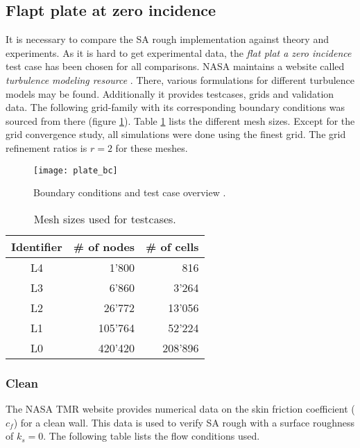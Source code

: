\subsection{Flapt plate at zero incidence}
\label{subsec:flat_plate_exp}
It is necessary to compare the SA rough implementation against theory and
experiments. As it is hard to get experimental data, the \textit{flat plat a
zero incidence} test case has been chosen for all comparisons. NASA maintains a
website called \textit{turbulence modeling resource} \cite{rumsey_flat}. There,
various formulations for different turbulence models may be found. Additionally
it provides testcases, grids and validation data. The following grid-family with
its corresponding boundary conditions was sourced from there (figure
\ref{fig:plate_bc}). Table \ref{tab:plate_sizes} lists the different mesh sizes.
Except for the grid convergence study, all simulations were done using the
finest grid. The grid refinement ratios is $r = 2$ for these meshes.

\begin{figure}[H] \centering
\texttt{[image: plate\_bc]}
    \caption{Boundary conditions and test case overview \cite{rumsey_flat}.}
    \label{fig:plate_bc}
\end{figure}

\begin{table}[H]
  \centering
  \begin{tabular}{c r r}
    Identifier      & \# of nodes   & \# of cells \\
    \toprule
    L4              & 1'800         & 816 \\
    L3              & 6'860         & 3'264 \\
    L2              & 26'772        & 13'056 \\
    L1              & 105'764       & 52'224 \\
    L0              & 420'420       & 208'896 \\

  \end{tabular}
  \caption{Mesh sizes used for testcases.}
  \label{tab:plate_sizes}
\end{table}

\subsubsection{Clean}
The NASA TMR website \cite{rumsey_flat} provides numerical data on the skin
friction coefficient ($c_{f}$) for a clean wall. This data is used to verify SA
rough with a surface roughness of $k_{s} = 0$. The following table lists the
flow conditions used.

